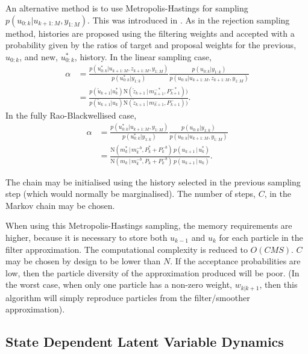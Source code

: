\documentclass[twocolumn]{autart}    %
\begin{document}
An alternative method is to use Metropolis-Hastings for sampling $p(u_{0:k}|u_{k+1:M}, y_{1:M})$. This was introduced in \cite{Bunch+Godsill:2012}. As in the rejection sampling method, histories are proposed using the filtering weights and accepted with a probability given by the ratios of target and proposal weights for the previous, $u_{0:k}$, and new, $u_{0:k}^*$, history. In the linear sampling case,
%
\begin{equation}
\begin{split}
  \alpha &= \frac{ p(u_{0:k}^*|u_{k+1:M}, z_{k+1:M}, y_{1:M}) }{ p(u_{0:k}^*|y_{1:k}) }\frac{ p(u_{0:k}|y_{1:k}) }{ p(u_{0:k}|u_{k+1:M}, z_{k+1:M}, y_{1:M}) } \\
  &= \frac{ p(\tilde{u}_{k+1} | u_k^{*}) \mathrm{N}(\tilde{z}_{k+1}\,|\, m^{-*}_{k+1}, P^{-*}_{k+1}) ) }{ p(\tilde{u}_{k+1} | u_k) \mathrm{N}(\tilde{z}_{k+1}\,|\, m^{-}_{k+1}, P^{-}_{k+1}) ) }     .
\end{split}
\end{equation}
%
In the fully Rao-Blackwellised case,
%
\begin{equation}
\begin{split}
  \alpha &= \frac{ p(u_{0:k}^*|u_{k+1:M}, y_{1:M}) }{ p(u_{0:k}^*|y_{1:k}) }\frac{ p(u_{0:k}|y_{1:k}) }{ p(u_{0:k}|u_{k+1:M}, y_{1:M}) } \\
  &= \frac{ \mathrm{N}(m_k^{*}\,|\,m^{-b}_{k},P_k^{*}+P^{-b}_{k}) \, p(u_{k+1}\,|\,u_{k}^{*}) }{ \mathrm{N}(m_k\,|\,m^{-b}_{k},P_k+P^{-b}_{k}) \, p(u_{k+1}\,|\,u_{k}) }     .
\end{split}
\end{equation}

The chain may be initialised using the history selected in the previous sampling step (which would normally be marginalised). The number of steps, $C$, in the Markov chain may be chosen.

When using this Metropolis-Hastings sampling, the memory requirements are higher, because it is necessary to store both $u_{k-1}$ and $u_k$ for each particle in the filter approximation. The computational complexity is reduced to $O(CMS)$. $C$ may be chosen by design to be lower than $N$. If the acceptance probabilities are low, then the particle diversity of the approximation produced will be poor. (In the worst case, when only one particle has a non-zero weight, $w_{k|k+1}$, then this algorithm will simply reproduce particles from the filter/smoother approximation).



\subsection{State Dependent Latent Variable Dynamics}
\end{document}
